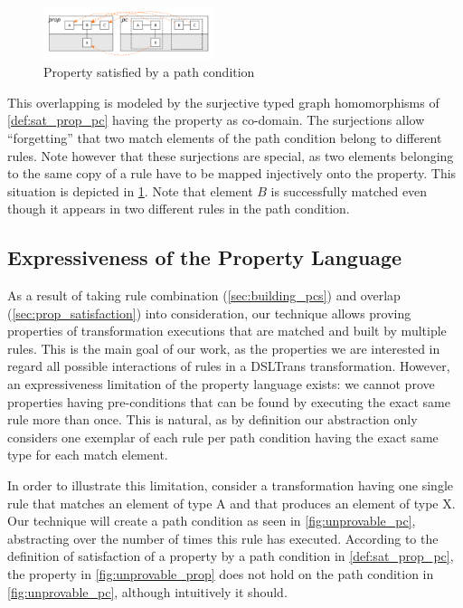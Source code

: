 \begin{figure}[htb]
 \centering
                \includegraphics[width=0.44\textwidth]{./figures/property_proving/prop_pc.pdf}
                \caption{Property satisfied by a path condition}
                \label{fig:prop_pc}
\end{figure}

This overlapping is modeled by the surjective typed graph homomorphisms of \cref{def:sat_prop_pc} having the property as co-domain. The surjections allow ``forgetting'' that two match elements of the path condition belong to different rules. Note however that these surjections are special, as two elements belonging to the same copy of a rule have to be mapped injectively onto the property. This situation is depicted in \cref{fig:prop_pc}. Note that element $B$ is successfully matched even though it appears in two different rules in the path condition. 



\subsection{Expressiveness of the Property Language}
\label{subsec:expressiveness_prop}

As a result of taking rule combination (\cref{sec:building_pcs}) and overlap (\cref{sec:prop_satisfaction}) into consideration, our technique allows proving properties of transformation executions that are matched and built by multiple rules. This is the main goal of our work, as the properties we are interested in regard all possible interactions of rules in a DSLTrans transformation. However, an expressiveness limitation of the property language exists: we cannot prove properties having pre-conditions that can be found by executing the exact same rule more than once. This is natural, as by definition our abstraction only considers one exemplar of each rule per path condition having the exact same type for each match element. 

In order to illustrate this limitation, consider a transformation having one single rule that matches an element of type A and that produces an element of type X. Our technique will create a path condition as seen in \cref{fig:unprovable_pc}, abstracting over the number of times this rule has executed. According to the definition of satisfaction of a property by a path condition in \cref{def:sat_prop_pc}, the property in \cref{fig:unprovable_prop} does not hold on the path condition in \cref{fig:unprovable_pc}, although intuitively it should.

